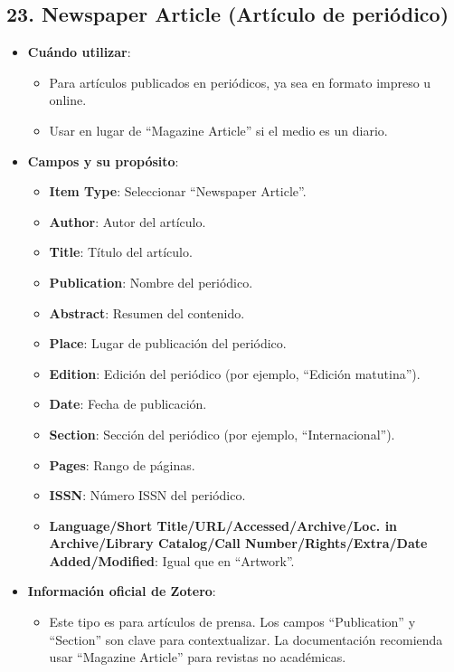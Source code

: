 \documentclass[
  jou,
  floatsintext,
  longtable,
  a4paper,
  nolmodern,
  notxfonts,
  notimes,
  colorlinks=true,linkcolor=blue,citecolor=blue,urlcolor=blue]{apa7}
\providecommand{\tightlist}{%
  \setlength{\itemsep}{0pt}\setlength{\parskip}{0pt}}
\begin{document}
\subsection{23. Newspaper Article (Artículo de
periódico)}\label{newspaper-article-artuxedculo-de-periuxf3dico}

\begin{itemize}
\tightlist
\item
  \textbf{Cuándo utilizar}:

  \begin{itemize}
  \tightlist
  \item
    Para artículos publicados en periódicos, ya sea en formato impreso u
    online.
  \item
    Usar en lugar de ``Magazine Article'' si el medio es un diario.
  \end{itemize}
\item
  \textbf{Campos y su propósito}:

  \begin{itemize}
  \tightlist
  \item
    \textbf{Item Type}: Seleccionar ``Newspaper Article''.
  \item
    \textbf{Author}: Autor del artículo.
  \item
    \textbf{Title}: Título del artículo.
  \item
    \textbf{Publication}: Nombre del periódico.
  \item
    \textbf{Abstract}: Resumen del contenido.
  \item
    \textbf{Place}: Lugar de publicación del periódico.
  \item
    \textbf{Edition}: Edición del periódico (por ejemplo, ``Edición
    matutina'').
  \item
    \textbf{Date}: Fecha de publicación.
  \item
    \textbf{Section}: Sección del periódico (por ejemplo,
    ``Internacional'').
  \item
    \textbf{Pages}: Rango de páginas.
  \item
    \textbf{ISSN}: Número ISSN del periódico.
  \item
    \textbf{Language/Short Title/URL/Accessed/Archive/Loc. in
    Archive/Library Catalog/Call Number/Rights/Extra/Date
    Added/Modified}: Igual que en ``Artwork''.
  \end{itemize}
\item
  \textbf{Información oficial de Zotero}:

  \begin{itemize}
  \tightlist
  \item
    Este tipo es para artículos de prensa. Los campos ``Publication'' y
    ``Section'' son clave para contextualizar. La documentación
    recomienda usar ``Magazine Article'' para revistas no académicas.
  \end{itemize}
\end{itemize}
\end{document}

